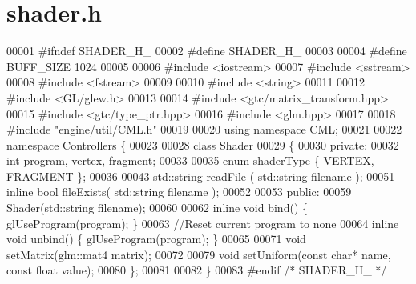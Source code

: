 \section{shader.\+h}
\label{shader_8h_source}

\begin{DoxyCode}
00001 \textcolor{preprocessor}{#ifndef SHADER\_H\_}
00002 \textcolor{preprocessor}{#define SHADER\_H\_}
00003 
00004 \textcolor{preprocessor}{#define BUFF\_SIZE 1024}
00005 
00006 \textcolor{preprocessor}{#include <iostream>}
00007 \textcolor{preprocessor}{#include <sstream>}
00008 \textcolor{preprocessor}{#include <fstream>}
00009 
00010 \textcolor{preprocessor}{#include <string>}
00011 
00012 \textcolor{preprocessor}{#include <GL/glew.h>}
00013 
00014 \textcolor{preprocessor}{#include <gtc/matrix\_transform.hpp>}
00015 \textcolor{preprocessor}{#include <gtc/type\_ptr.hpp>}
00016 \textcolor{preprocessor}{#include <glm.hpp>}
00017 
00018 \textcolor{preprocessor}{#include "engine/util/CML.h"}
00019 
00020 \textcolor{keyword}{using namespace }CML;
00021 
00022 \textcolor{keyword}{namespace }Controllers \{
00023 
00028     \textcolor{keyword}{class }Shader
00029     \{
00030     \textcolor{keyword}{private}:
00032         \textcolor{keywordtype}{int} program, vertex, fragment;
00033 
00035         \textcolor{keyword}{enum} shaderType \{ VERTEX, FRAGMENT \};
00036 
00043         std::string readFile  ( std::string filename );
00051         \textcolor{keyword}{inline} \textcolor{keywordtype}{bool} fileExists( std::string filename );
00052 
00053     \textcolor{keyword}{public}:
00059         Shader(std::string filename);
00060 
00062         \textcolor{keyword}{inline} \textcolor{keywordtype}{void} bind()   \{ glUseProgram(program); \}
00063         \textcolor{comment}{//Reset current program to none}
00064         \textcolor{keyword}{inline} \textcolor{keywordtype}{void} unbind() \{ glUseProgram(program); \}
00065 
00071         \textcolor{keywordtype}{void} setMatrix(glm::mat4 matrix);
00072 
00079         \textcolor{keywordtype}{void} setUniform(\textcolor{keyword}{const} \textcolor{keywordtype}{char}* name, \textcolor{keyword}{const} \textcolor{keywordtype}{float} value);
00080     \};
00081 
00082 \}
00083 \textcolor{preprocessor}{#endif }\textcolor{comment}{/* SHADER\_H\_ */}\textcolor{preprocessor}{}
\end{DoxyCode}

